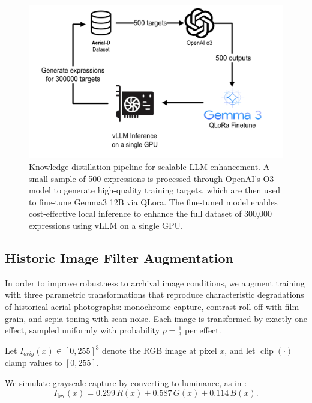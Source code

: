 \begin{figure}[H]
\centering
\includegraphics[width=\columnwidth]{./images/distillation.png}
\caption{Knowledge distillation pipeline for scalable LLM enhancement. A small sample of 500 expressions is processed through OpenAI's O3 model to generate high-quality training targets, which are then used to fine-tune Gemma3 12B via QLora. The fine-tuned model enables cost-effective local inference to enhance the full dataset of 300,000 expressions using vLLM on a single GPU.}
\label{fig:llm_distillation}
\end{figure}

\subsection{Historic Image Filter Augmentation}
\label{subsec:historic_filters}

In order to improve robustness to archival image conditions, we augment training with three parametric transformations that reproduce characteristic degradations of historical aerial photographs: monochrome capture, contrast roll‑off with film grain, and sepia toning with scan noise. Each image is transformed by exactly one effect, sampled uniformly with probability $p=\tfrac{1}{3}$ per effect.

Let $I_{orig}(x)\in[0,255]^3$ denote the RGB image at pixel $x$, and let $\operatorname{clip}(\cdot)$ clamp values to $[0,255]$.

We simulate grayscale capture by converting to luminance, as in :
\begin{equation}
I_{\text{bw}}(x) = 0.299\,R(x) + 0.587\,G(x) + 0.114\,B(x).
\label{eq:gray}
\end{equation}

